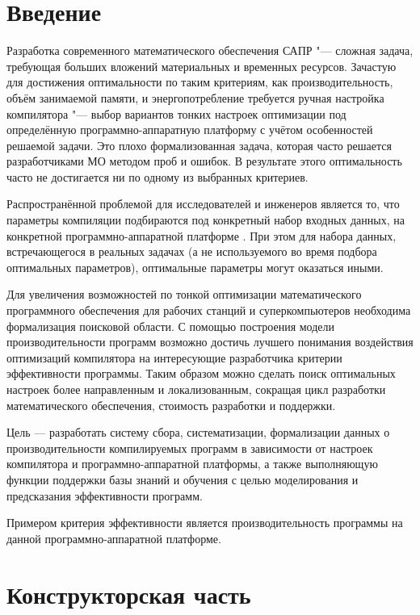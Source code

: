 \chapter*{Введение}
%
Разработка современного математического обеспечения САПР "--- сложная задача, требующая больших вложений материальных и временных ресурсов. Зачастую для достижения оптимальности по таким критериям, как производительность, объём занимаемой памяти, и энергопотребление требуется ручная настройка компилятора "--- выбор вариантов тонких настроек оптимизации под определённую программно-аппаратную платформу с учётом особенностей решаемой задачи. Это плохо формализованная задача, которая часто решается разработчиками МО методом проб и ошибок. В результате этого оптимальность часто не достигается ни по одному из выбранных критериев.

Распространённой проблемой для исследователей и инженеров является то, что параметры компиляции подбираются под конкретный набор входных данных, на конкретной программно-аппаратной платформе \cite{Jimenez:2008:PRC:1505816.1505822,luo:inria-00436034}. При этом для набора данных, встречающегося в реальных задачах (а не используемого во время подбора оптимальных параметров), оптимальные параметры могут оказаться иными.

Для увеличения возможностей по тонкой оптимизации математического программного обеспечения для рабочих станций и суперкомпьютеров необходима формализация поисковой области. С помощью построения модели производительности программ возможно достичь лучшего понимания воздействия оптимизаций компилятора на интересующие разработчика критерии эффективности программы. Таким образом можно сделать поиск оптимальных настроек более направленным и локализованным, сокращая цикл разработки математического обеспечения, стоимость разработки и поддержки.

Цель — разработать систему сбора, систематизации, формализации данных о производительности компилируемых программ в зависимости от настроек компилятора и программно-аппаратной платформы, а также выполняющую функции поддержки базы знаний и обучения с целью моделирования и предсказания эффективности программ.

Примером критерия эффективности является производительность программы на данной программно-аппаратной платформе.

\chapter{Конструкторская часть}
